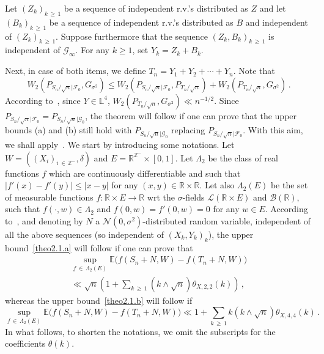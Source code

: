 \documentclass[10pt]{amsart}
\theoremstyle{definition}\newtheorem{defi}[theo]{Definition}\newtheorem{rema}[theo]{Remark}\newtheorem{exam}[theo]{Example}\newtheorem{exem}[theo]{Example}\newtheorem{nota}[theo]{Notation}
\newcommand{\bbE}{\mathbb{E}}
\newcommand{\bbZ}{\mathbb{Z}}
\newcommand{\clF}{\mathcal{F}}
\newcommand{\clN}{\mathcal{N}}
\newcommand{\clL}{\mathcal{L}}
\newcommand{\clB}{\mathcal{B}}
\newcommand{\clG}{\mathcal{G}}
\newcommand{\bbR}{\mathbb{R}}
\newcommand{\bbL}{\mathbb{L}}
\begin{document}
Let $(Z_k)_{k\,\geq\,1}$ be a sequence of independent r.v.'s distributed as $Z$ and let $(B_k)_{k\,\geq\,1}$ be a sequence of independent r.v.'s distributed as $B$ and independent of $(Z_k)_{k\,\geq\,1}$. Suppose furthermore that the sequence $(Z_k,B_k)_{k\,\geq\,1}$ is independent of $\clG_\infty$. For any $k \geq 1$, set $Y_k = Z_k+B_k$.

Next, in case of both items, we define $T_n = Y_1 + Y_2 + \cdots + Y_n$. Note that
\[
W_2 \left(P_{S_n / {\sqrt n}|\clF_0 }, G_{\sigma^2}\right) \leq W_2 \left(P_{S_n / {\sqrt n}|\clF_0 }, P_{T_n / {\sqrt n}}\right) + W_2 \left(P_{T_n / {\sqrt n}}, G_{\sigma^2}\right) \,.
\]
According to~\cite[Theorem~4.1]{Rio09}, since $Y \in \bbL^4$, $W_2 (P_{T_n / {\sqrt n}}, G_{\sigma^2}) \ll n^{-1/2}$. Since $P_{S_n / {\sqrt n}|\clF_0} = P_{S_n / {\sqrt n}|\clG_0}$, the theorem will follow if one can prove that the upper bounds (a) and (b) still hold with $P_{S_n / {\sqrt n}|\clG_0 }$ replacing $P_{S_n / {\sqrt n}|\clF_0 }$. With this aim, we shall apply~\cite[Lemma~A.1]{MR12}. We start by introducing some notations. Let $W= ((X_i)_{i\,\in\,{\bbZ}^-}, \delta)$ and $E = {\bbR}^{{\bbZ}^-} \times [0,1]$. Let $\Lambda_2$ be the class of real functions $f$ which are continuously differentiable and such that $|f'(x) - f'(y) |\leq | x - y |$ for any $(x,y) \in \bbR \times \bbR$. Let also $\Lambda_2 (E)$ be the set of measurable functions $f:\bbR
\times E \rightarrow \bbR$ wrt the $\sigma$-fields $\clL(\bbR \times E) $ and $\clB (\bbR)$, such that $f(\cdot, w) \in \Lambda_2$ and $f(0,w)=f'(0,w)=0$ for any $w \in E$. According to~\cite[Lemma~A.1]{MR12}, and denoting by $N$ a $\clN(0,\sigma^2)$-distributed random variable, independent of all the above sequences (so independent of $(X_k,Y_k)_k$), the upper bound~\eqref{theo2.1.a} will follow if one can prove that
\begin{multline}\label{W2condp2-Itema}
\sup_{f\,\in\,\Lambda_2 (E)} \bbE \big(f (S_n + N, W) - f (T_n + N, W) \big)\\
\ll \sqrt{n} \left(1 + \sum_{k\,\geq\,1} \left(k \wedge \sqrt{n}\right) \theta_{X,2,2} (k) \right) \,,
\end{multline}
whereas the upper bound~\eqref{theo2.1.b} will follow if
\begin{equation}\label{W2condp2}
\sup_{f\,\in\,\Lambda_2 (E) } \bbE \big (f (S_n + N, W) - f (T_n + N, W) \big) \ll 1 + \sum_{k\,\geq\,1} k \left(k \wedge \sqrt{n}\right) \theta_{X,4,4} (k) \,.
\end{equation}
In what follows, to shorten the notations, we omit the subscripts for the coefficients $\theta (k)$.
\end{document}

